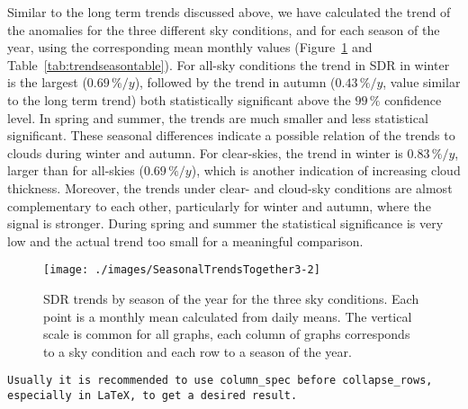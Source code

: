 \documentclass[applsci,article,submit,moreauthors,pdftex]{Definitions/mdpi}
\begin{document}
Similar to the long term trends discussed above, we have calculated the
trend of the anomalies for the three different sky conditions, and for
each season of the year, using the corresponding mean monthly values
(Figure~\ref{fig:seasonalALL} and Table~\ref{tab:trendseasontable}). For
all-sky conditions the trend in SDR in winter is the largest
(\(0.69\,\%/y\)), followed by the trend in autumn (\(0.43\,\%/y\), value
similar to the long term trend) both statistically significant above the
\(99\,\%\) confidence level. In spring and summer, the trends are much
smaller and less statistical significant. These seasonal differences
indicate a possible relation of the trends to clouds during winter and
autumn. For clear-skies, the trend in winter is \(0.83\,\%/y\), larger
than for all-skies (\(0.69\,\%/y\)), which is another indication of
increasing cloud thickness. Moreover, the trends under clear- and
cloud-sky conditions are almost complementary to each other,
particularly for winter and autumn, where the signal is stronger. During
spring and summer the statistical significance is very low and the
actual trend too small for a meaningful comparison.

\begin{figure}[h!]

{\centering \texttt{[image: ./images/SeasonalTrendsTogether3-2]} 

}

\caption{SDR trends by season of the year for the three sky conditions. Each point is a monthly mean calculated from daily means. The vertical scale is common for all graphs, each column of graphs corresponds to a sky condition and each row to a season of the year.}\label{fig:seasonalALL}
\end{figure}

\begin{verbatim}
Usually it is recommended to use column_spec before collapse_rows, especially in LaTeX, to get a desired result. 
\end{verbatim}
\end{document}
